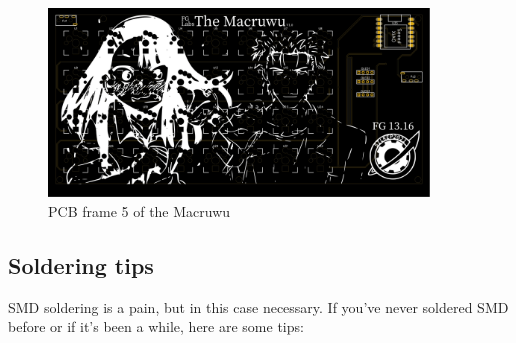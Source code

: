 \documentclass[english, 12pt]{scrartcl}
\begin{document}
	\begin{figure}[H]
		\centering
		\includegraphics[width=0.9\textwidth]{Macruwu PCB_5}
		\caption{PCB frame 5 of the Macruwu}
	\end{figure}
	
	\subsection{Soldering tips}
	SMD soldering is a pain, but in this case necessary. If you've never soldered SMD before or if it's been a while, here are some tips:
\end{document}

